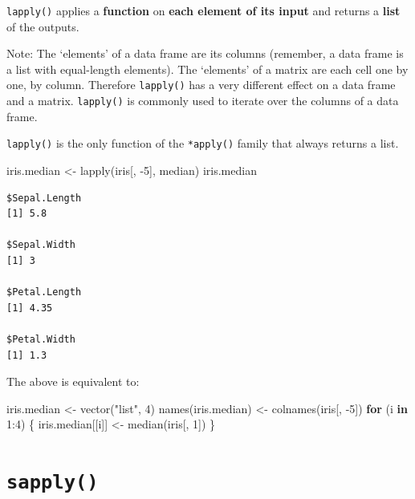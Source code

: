\documentclass[
]{book}
\newenvironment{Shaded}{\begin{snugshade}}{\end{snugshade}}
\newcommand{\ControlFlowTok}[1]{\textcolor[rgb]{0.13,0.29,0.53}{\textbf{#1}}}
\newcommand{\DecValTok}[1]{\textcolor[rgb]{0.00,0.00,0.81}{#1}}
\newcommand{\FunctionTok}[1]{\textcolor[rgb]{0.00,0.00,0.00}{#1}}
\newcommand{\NormalTok}[1]{#1}
\newcommand{\OtherTok}[1]{\textcolor[rgb]{0.56,0.35,0.01}{#1}}
\newcommand{\SpecialCharTok}[1]{\textcolor[rgb]{0.00,0.00,0.00}{#1}}
\newcommand{\StringTok}[1]{\textcolor[rgb]{0.31,0.60,0.02}{#1}}
\begin{document}
\begin{rmdtip}
\texttt{lapply()} applies a \textbf{function} on \textbf{each element of
its input} and returns a \textbf{list} of the outputs.
\end{rmdtip}

Note: The `elements' of a data frame are its columns (remember, a data frame is a list with equal-length elements). The `elements' of a matrix are each cell one by one, by column. Therefore \texttt{lapply()} has a very different effect on a data frame and a matrix. \texttt{lapply()} is commonly used to iterate over the columns of a data frame.

\texttt{lapply()} is the only function of the \texttt{*apply()} family that always returns a list.

\begin{Shaded}
\begin{Highlighting}[]
\NormalTok{iris.median }\OtherTok{\textless{}{-}} \FunctionTok{lapply}\NormalTok{(iris[, }\SpecialCharTok{{-}}\DecValTok{5}\NormalTok{], median)}
\NormalTok{iris.median}
\end{Highlighting}
\end{Shaded}

\begin{verbatim}
$Sepal.Length
[1] 5.8

$Sepal.Width
[1] 3

$Petal.Length
[1] 4.35

$Petal.Width
[1] 1.3
\end{verbatim}

The above is equivalent to:

\begin{Shaded}
\begin{Highlighting}[]
\NormalTok{iris.median }\OtherTok{\textless{}{-}} \FunctionTok{vector}\NormalTok{(}\StringTok{"list"}\NormalTok{, }\DecValTok{4}\NormalTok{)}
\FunctionTok{names}\NormalTok{(iris.median) }\OtherTok{\textless{}{-}} \FunctionTok{colnames}\NormalTok{(iris[, }\SpecialCharTok{{-}}\DecValTok{5}\NormalTok{])}
\ControlFlowTok{for}\NormalTok{ (i }\ControlFlowTok{in} \DecValTok{1}\SpecialCharTok{:}\DecValTok{4}\NormalTok{) \{}
\NormalTok{  iris.median[[i]] }\OtherTok{\textless{}{-}} \FunctionTok{median}\NormalTok{(iris[, }\DecValTok{1}\NormalTok{])}
\NormalTok{\}}
\end{Highlighting}
\end{Shaded}

\hypertarget{sapply}{%
\section{\texorpdfstring{\texttt{sapply()}}{sapply()}}\label{sapply}}
\end{document}
